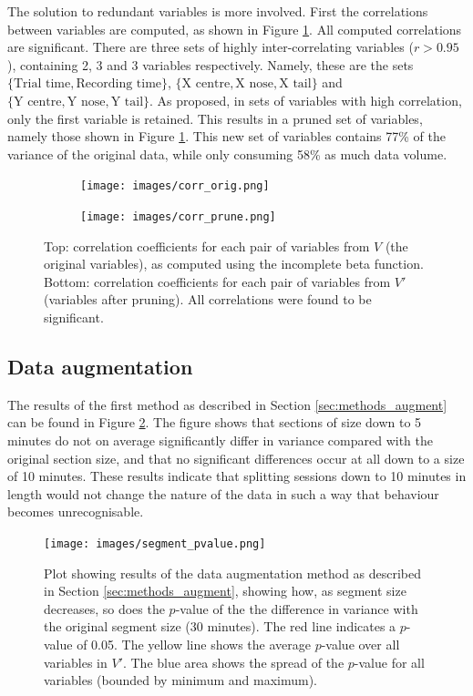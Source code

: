 \documentclass[conference,a4paper,twoside]{IEEEtran}
\begin{document}
The solution to redundant variables is more involved. First the correlations between variables are computed, as shown in Figure \ref{fig:correlations}. All computed correlations are significant. There are three sets of highly inter-correlating variables ($r>0.95$), containing 2, 3 and 3 variables respectively. Namely, these are the sets $\{\text{Trial time}, \text{Recording time}\}$, $\{\text{X centre}, \text{X nose}, \text{X tail}\}$ and $\{\text{Y centre}, \text{Y nose}, \text{Y tail}\}$. As proposed, in sets of variables with high correlation, only the first variable is retained. This results in a pruned set of variables, namely those shown in Figure \ref{fig:correlations}. This new set of variables contains 77\% of the variance of the original data, while only consuming 58\% as much data volume.

\begin{figure}
    \centering
    \begin{subfigure}{}
        \texttt{[image: images/corr\_orig.png]}
    \end{subfigure}
    \hfill
    \begin{subfigure}{}
        \texttt{[image: images/corr\_prune.png]}
    \end{subfigure}
    \caption{Top: correlation coefficients for each pair of variables from $V$ (the original variables), as computed using the incomplete beta function. Bottom: correlation coefficients for each pair of variables from $V'$ (variables after pruning). All correlations were found to be significant.}
    \label{fig:correlations}
\end{figure}

\subsection{Data augmentation}
\label{sec:results_augment}
The results of the first method as described in Section \ref{sec:methods_augment} can be found in Figure \ref{fig:split_variance}. The figure shows that sections of size down to 5 minutes do not on average significantly differ in variance compared with the original section size, and that no significant differences occur at all down to a size of 10 minutes. These results indicate that splitting sessions down to 10 minutes in length would not change the nature of the data in such a way that behaviour becomes unrecognisable.

\begin{figure}
    \centering
    \texttt{[image: images/segment\_pvalue.png]}
    \caption{Plot showing results of the data augmentation method as described in Section \ref{sec:methods_augment}, showing how, as segment size decreases, so does the $p$-value of the the difference in variance with the original segment size (30 minutes). The red line indicates a $p$-value of 0.05. The yellow line shows the average $p$-value over all variables in $V'$. The blue area shows the spread of the $p$-value for all variables (bounded by minimum and maximum).}
    \label{fig:split_variance}
\end{figure}
\end{document}
